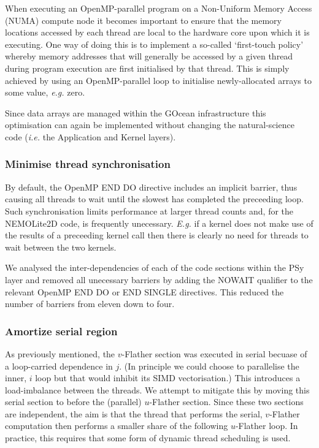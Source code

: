 \documentclass[gmd, manuscript]{copernicus}
\begin{document}
When executing an OpenMP-parallel program on a Non-Uniform Memory
Access (NUMA) compute node it becomes important to ensure that the
memory locations accessed by each thread are local to the hardware
core upon which it is executing. One way of doing this is to implement
a so-called `first-touch policy' whereby memory addresses that will
generally be accessed by a given thread during program execution are
first initialised by that thread. This is simply achieved by using an
OpenMP-parallel loop to initialise newly-allocated arrays to some
value, \textit{e.g.} zero.

Since data arrays are managed within the GOcean infrastructure this
optimisation can again be implemented without changing the
natural-science code (\textit{i.e.} the Application and Kernel layers).

\subsubsection{Minimise thread synchronisation}
\label{sec_synch}

By default, the OpenMP END DO directive includes an implicit barrier,
thus causing all threads to wait until the slowest has completed the
preceeding loop. Such synchronisation limits performance at larger
thread counts and, for the NEMOLite2D code, is frequently unecessary.
\textit{E.g.} if a kernel does not make use of the results of a
preceeding kernel call then there is clearly no need for threads to
wait between the two kernels.

We analysed the inter-dependencies of each of the code sections within
the PSy layer and removed all unecessary barriers by adding the NOWAIT
qualifier to the relevant OpenMP END DO or END SINGLE directives. This
reduced the number of barriers from eleven down to four.

\subsubsection{Amortize serial region}
\label{sec_amortize}

As previously mentioned, the $v$-Flather section was executed in
serial becuase of a loop-carried dependence in $j$. (In principle we
could choose to parallelise the inner, $i$ loop but that would inhibit
its SIMD vectorisation.) This introduces a load-imbalance between the
threads. We attempt to mitigate this by moving this serial section to
before the (parallel) $u$-Flather section. Since these two sections are
independent, the aim is that the thread that performs the serial,
$v$-Flather computation then performs a smaller share of the following
$u$-Flather loop. In practice, this requires that some form of dynamic
thread scheduling is used.
\end{document}
